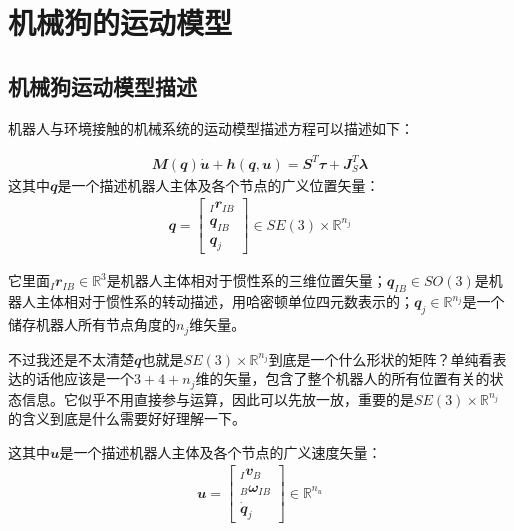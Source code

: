 
\chapter{机械狗的运动模型}

\section{机械狗运动模型描述}

机器人与环境接触的机械系统的运动模型描述方程可以描述如下\cite[p2]{Bellicoso_Jenelten_Fankhauser_Gehring_Hwangbo_Hutter_2017}：

\begin{align}
    {\mathbfit M}({\mathbfit q})\dot{\mathbfit u} + {\mathbfit h}({\mathbfit q}, {\mathbfit u}) =  {\mathbfit S}^T{\mathbfit \tau} + {\mathbfit J}_S^T {\mathbfit \lambda}
\end{align}
这其中${\mathbfit q}$是一个描述机器人主体及各个节点的广义位置矢量：
\begin{align}
    {\mathbfit q}= \begin{bmatrix}_I {\mathbfit r}_{IB} \\ {\mathbfit q}_{IB} \\ {\mathbfit q}_j\end{bmatrix} \in SE(3)\times {\mathbb R}^{n_j}
\end{align}

它里面$_I {\mathbfit r}_{IB} \in {\mathbb R}^{3}$是机器人主体相对于惯性系的三维位置矢量；${\mathbfit q}_{IB} \in SO(3)$是机器人主体相对于惯性系的转动描述，用哈密顿单位四元数表示的；${\mathbfit q}_j \in {\mathbb R}^{n_j}$是一个储存机器人所有节点角度的$n_j$维矢量。

\begin{note}
    不过我还是不太清楚$\mathbfit q$也就是$SE(3)\times {\mathbb R}^{n_j}$到底是一个什么形状的矩阵？单纯看表达的话他应该是一个$3+4+n_j$维的矢量，包含了整个机器人的所有位置有关的状态信息。它似乎不用直接参与运算，因此可以先放一放，重要的是$SE(3)\times {\mathbb R}^{n_j}$的含义到底是什么需要好好理解一下。
\end{note}

这其中${\mathbfit u}$是一个描述机器人主体及各个节点的广义速度矢量：
\begin{align}
    {\mathbfit u}= \begin{bmatrix}_I{\mathbfit v}_B \\ _B{\mathbfit \omega}_{IB} \\ \dot {\mathbfit q}_j \end{bmatrix} \in {\mathbb R}^{n_u} 
\end{align}

